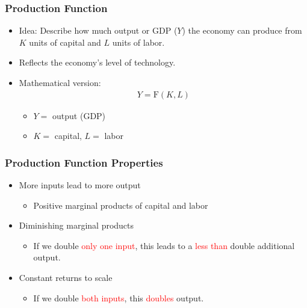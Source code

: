 \documentclass[handout]{beamer}
\begin{document}


\begin{frame}[t]
\frametitle{Production Function}
\begin{itemize}
\item Idea: Describe how much output or GDP ($Y$) the economy can produce from $K$ units of capital and $L$ units of labor.
\bigskip
\item Reflects the economy's level of technology.
\bigskip
\item Mathematical version:
\begin{eqnarray*}
Y = \mbox{F}(K,L)
\end{eqnarray*}
\vspace{-.5cm}
\begin{itemize}
\item $Y = $ output (GDP)
\medskip
\item $K = $ capital, $L = $ labor
\end{itemize}
\bigskip
\end{itemize}
\end{frame}



\begin{frame}[t]
\frametitle{Production Function Properties}
\begin{itemize}
\item More inputs lead to more output
\begin{itemize}
\medskip
\item Positive marginal products of capital and labor
\end{itemize}
\bigskip
\item Diminishing marginal products
\begin{itemize}
\medskip
\item If we double \textcolor{red}{only one input}, this leads to a \textcolor{red}{less than} double additional output.
\end{itemize}
\bigskip
\item Constant returns to scale
\begin{itemize}
\medskip
\item If we double \textcolor{red}{both inputs}, this \textcolor{red}{doubles} output.
\end{itemize}
\end{itemize}
\bigskip
\end{frame}
\end{document}
